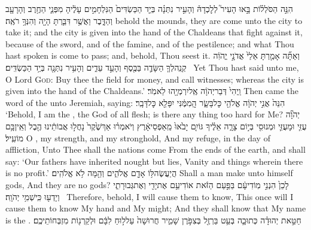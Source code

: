 {הִנֵּ֣ה הַסֹּלְל֗וֹת בָּ֣אוּ הָעִיר֮ לְלׇכְדָהּ֒ וְהָעִ֣יר נִתְּנָ֗ה בְּיַ֤ד הַכַּשְׂדִּים֙ הַנִּלְחָמִ֣ים עָלֶ֔יהָ מִפְּנֵ֛י הַחֶ֥רֶב וְהָרָעָ֖ב וְהַדָּ֑בֶר וַאֲשֶׁ֥ר דִּבַּ֛רְתָּ הָיָ֖ה וְהִנְּךָ֥ רֹאֶֽה׃}
{behold the mounds, they are come unto the city to take it; and the city is given into the hand of the Chaldeans that fight against it, because of the sword, and of the famine, and of the pestilence; and what Thou hast spoken is come to pass; and, behold, Thou seest it.}
{וְאַתָּ֞ה אָמַ֤רְתָּ אֵלַי֙ אֲדֹנָ֣י יֱהֹוִ֔ה קְנֵֽה\maqqaf לְךָ֧ הַשָּׂדֶ֛ה בַּכֶּ֖סֶף וְהָעֵ֣ד עֵדִ֑ים וְהָעִ֥יר נִתְּנָ֖ה בְּיַ֥ד הַכַּשְׂדִּֽים׃ \setuma }
{Yet Thou hast said unto me, O Lord \textsc{God}: Buy thee the field for money, and call witnesses; whereas the city is given into the hand of the Chaldeans.’}
{וַֽיְהִי֙ דְּבַר\maqqaf יְהֹוָ֔ה אֶֽל\maqqaf יִרְמְיָ֖הוּ לֵאמֹֽר׃}
{Then came the word of the \lord\space unto Jeremiah, saying:}
{הִנֵּה֙ אֲנִ֣י יְהֹוָ֔ה אֱלֹהֵ֖י כׇּל\maqqaf בָּשָׂ֑ר הֲֽמִמֶּ֔נִּי יִפָּלֵ֖א כׇּל\maqqaf דָּבָֽר׃}
{‘Behold, I am the \lord, the God of all flesh; is there any thing too hard for Me?}
\label{haft_33}
\setcounter{chap}{16}
\setcounter{verse}{19}
{יְהֹוָ֞ה עֻזִּ֧י וּמָעֻזִּ֛י וּמְנוּסִ֖י בְּי֣וֹם צָרָ֑ה אֵלֶ֗יךָ גּוֹיִ֤ם יָבֹ֙אוּ֙ מֵֽאַפְסֵי\maqqaf אָ֔רֶץ וְיֹאמְר֗וּ אַךְ\maqqaf שֶׁ֙קֶר֙ נָחֲל֣וּ אֲבוֹתֵ֔ינוּ הֶ֖בֶל וְאֵֽין\maqqaf בָּ֥ם מוֹעִֽיל׃}
{O \lord, my strength, and my stronghold, And my refuge, in the day of affliction, Unto Thee shall the nations come From the ends of the earth, and shall say: ‘Our fathers have inherited nought but lies, Vanity and things wherein there is no profit.’}
{הֲיַעֲשֶׂה\maqqaf לּ֥וֹ אָדָ֖ם אֱלֹהִ֑ים וְהֵ֖מָּה לֹ֥א אֱלֹהִֽים׃}
{Shall a man make unto himself gods, And they are no gods?}
{לָכֵן֙ הִנְנִ֣י מֽוֹדִיעָ֔ם בַּפַּ֣עַם הַזֹּ֔את אוֹדִיעֵ֥ם אֶת\maqqaf יָדִ֖י וְאֶת\maqqaf גְּבוּרָתִ֑י וְיָדְע֖וּ כִּֽי\maqqaf שְׁמִ֥י יְהֹוָֽה׃ \setuma }
{Therefore, behold, I will cause them to know, This once will I cause them to know My hand and My might; And they shall know that My name is the \lord.}
\newperek
{}
{חַטַּ֣את יְהוּדָ֗ה כְּתוּבָ֛ה בְּעֵ֥ט בַּרְזֶ֖ל בְּצִפֹּ֣רֶן שָׁמִ֑יר חֲרוּשָׁה֙ עַל\maqqaf ל֣וּחַ לִבָּ֔ם וּלְקַרְנ֖וֹת מִזְבְּחוֹתֵיכֶֽם׃}
